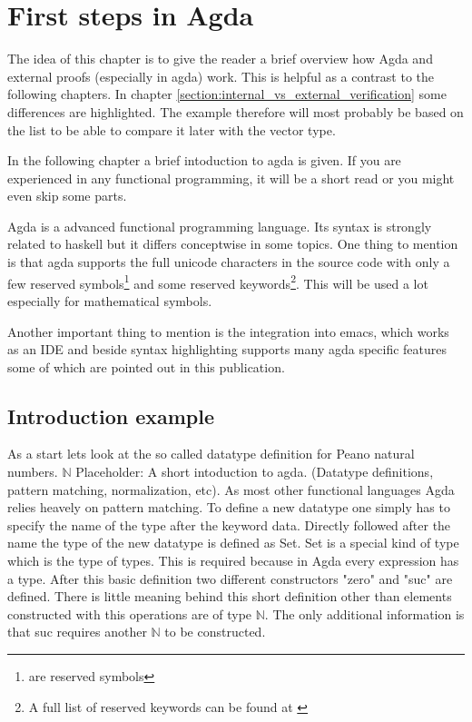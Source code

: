 \section{First steps in Agda}\label{section:first_steps_in_agda}
The idea of this chapter is to give the reader a brief overview how Agda and external proofs (especially in agda) work. This is helpful as a contrast to the following chapters. 
In chapter \ref{section:internal_vs_external_verification} some differences are highlighted. The example therefore will most probably be based on the list to be able to compare it later with the vector type.

In the following chapter a brief intoduction to agda is given. If you are experienced in any functional programming, it will be a short read or you might even skip some parts.

Agda is a advanced functional programming language. Its syntax is strongly related to haskell but it differs conceptwise in some topics. 
One thing to mention is that agda supports the full unicode characters in the source code with only a few reserved symbols\footnote{ are reserved symbols\cite{AgdaReadTheDocsStructure}} 
and some reserved keywords\footnote{A full list of reserved keywords can be found at \cite{AgdaReadTheDocsStructure}}. This will be used a lot especially for mathematical symbols.

Another important thing to mention is the integration into emacs, which works as an IDE and beside syntax highlighting supports many agda specific features some of which are pointed out in this publication.

\subsection{Introduction example}
As a start lets look at the so called datatype definition for Peano natural numbers. $\mathbb{N}$
Placeholder: A short intoduction to agda. (Datatype definitions, pattern matching, normalization, etc).
As most other functional languages Agda relies heavely on pattern matching. 
To define a new datatype one simply has to specify the name of the type after the keyword data. Directly followed after the name the type of the new datatype is defined as Set. 
Set is a special kind of type which is the type of types. This is required because in Agda every expression has a type. 
After this basic definition two different constructors "zero" and "suc" are defined. 
There is little meaning behind this short definition other than elements constructed with this operations are of type $\mathbb{N}$.
The only additional information is that suc requires another $\mathbb{N}$ to be constructed.


